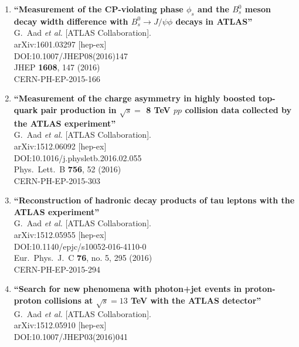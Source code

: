 \documentclass{article}
\begin{document}
\begin{enumerate}
\item%
{\bf ``Measurement of the CP-violating phase $\phi_s$ and the $B^0_s$ meson decay width difference with $B^0_s \to J/\psi\phi$ decays in ATLAS''}
  \\{}G.~Aad {\it et al.} [ATLAS Collaboration].
  \\{}arXiv:1601.03297 [hep-ex]
  \\{}DOI:10.1007/JHEP08(2016)147
  \\{}JHEP {\bf 1608}, 147 (2016)
  \\{}CERN-PH-EP-2015-166
\item%
{\bf ``Measurement of the charge asymmetry in highly boosted top-quark pair production in $\sqrt{s} =$ 8 TeV $pp$ collision data collected by the ATLAS experiment''}
  \\{}G.~Aad {\it et al.} [ATLAS Collaboration].
  \\{}arXiv:1512.06092 [hep-ex]
  \\{}DOI:10.1016/j.physletb.2016.02.055
  \\{}Phys.\ Lett.\ B {\bf 756}, 52 (2016)
  \\{}CERN-PH-EP-2015-303
\item%
{\bf ``Reconstruction of hadronic decay products of tau leptons with the ATLAS experiment''}
  \\{}G.~Aad {\it et al.} [ATLAS Collaboration].
  \\{}arXiv:1512.05955 [hep-ex]
  \\{}DOI:10.1140/epjc/s10052-016-4110-0
  \\{}Eur.\ Phys.\ J.\ C {\bf 76}, no. 5, 295 (2016)
  \\{}CERN-PH-EP-2015-294
\item%
{\bf ``Search for new phenomena with photon+jet events in proton-proton collisions at $ \sqrt{s}=13 $ TeV with the ATLAS detector''}
  \\{}G.~Aad {\it et al.} [ATLAS Collaboration].
  \\{}arXiv:1512.05910 [hep-ex]
  \\{}DOI:10.1007/JHEP03(2016)041

\end{enumerate}
\end{document}
